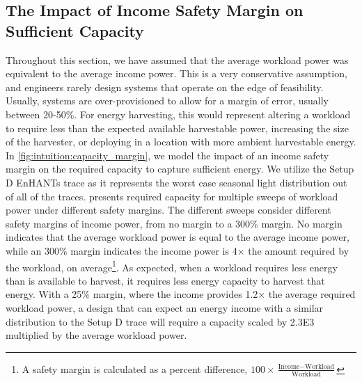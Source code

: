 \subsection{The Impact of Income Safety Margin on Sufficient Capacity}
\label{sec:intuition:margin}
Throughout this section, we have assumed that the average workload power was equivalent to the average income power. This is a very conservative assumption, and engineers rarely design systems that operate on the edge of feasibility.
Usually, systems are over-provisioned to allow for a margin of error, usually between 20-50\%.
For energy harvesting, this would represent altering a workload to require less than the expected available harvestable power, increasing the size of the harvester, or deploying in a location with more ambient harvestable energy.
In \cref{fig:intuition:capacity_margin}, we model the impact of an income safety margin on the required capacity to capture sufficient energy.
We utilize the Setup D EnHANTs trace as it represents the worst case seasonal light distribution out of all of the traces.
 presents required capacity for multiple sweeps of workload power under different safety margins.
The different sweeps consider different safety margins of income power, from no margin to a 300\% margin.
No margin indicates that the average workload power is equal to the average income power, while an 300\% margin indicates the income power is 4$\times$ the amount required by the workload, on average\footnote{A safety margin is calculated as a percent difference, $100 \times \frac{\text{Income} - \text{Workload}}{\text{Workload}}$}.
As expected, when a workload requires less energy than is available to harvest, it requires less energy capacity to harvest that energy.
With a 25\% margin, where the income provides 1.2$\times$ the average required workload power, a design that can expect an energy income with a similar distribution to the Setup D trace will require a capacity scaled by \num{2.3E3} multiplied by the average workload power.


